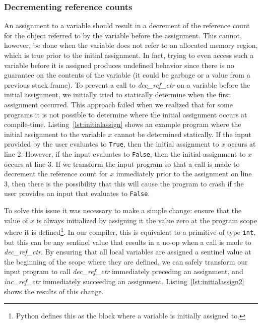 \documentclass{sigplanconf}
\newcommand{\avariable}[1]{\ensuremath{#1}}
\newcommand{\aliteral}[1]{\texttt{#1}}
\newcommand{\afunction}[1]{\textit{#1}}
\newcommand{\atype}[1]{\texttt{#1}}
\begin{document}
\subsubsection{Decrementing reference counts}
An assignment to a variable should result in a decrement of the reference count for the object referred to by the variable before the assignment.  This cannot, however, be done when the variable does not refer to an allocated memory region, which is true prior to the initial assignment.  In fact, trying to even access such a variable before it is assigned produces undefined behavior since there is no guarantee on the contents of the variable (it could be garbage or a value from a previous stack frame).   To prevent a call to \afunction{dec\_ref\_ctr} on a variable before the initial assignment, we initially tried to statically determine when the first assignment occurred.  This approach failed when we realized that for some programs it is not possible to determine where the initial assignment occurs at compile-time.  Listing~\ref{lst:initialassign} shows an example program where the initial assignment to the variable \avariable{x} cannot be determined statically.  If the input provided by the user evaluates to \aliteral{True}, then the initial assignment to $x$ occurs at line 2.  However, if the input evaluates to \aliteral{False}, then the initial assignment to \avariable{x} occurs at line 3.  If we transform the input program so that a call is made to decrement the reference count for \avariable{x} immediately prior to the assignment on line 3, then there is the possibility that this will cause the program to crash if the user provides an input that evaluates to \aliteral{False}.

To solve this issue it was necessary to make a simple change: ensure that the value of \avariable{x} is always initialized by assigning it the value zero at the program scope where it is defined\footnote{Python defines this as the block where a variable is initially assigned to.}.  In our compiler, this is equivalent to a primitive of type \atype{int}, but this can be any sentinel value that results in a no-op when a call is made to \afunction{dec\_ref\_ctr}.  By ensuring that all local variables are assigned a sentinel value at the beginning of the scope where they are defined, we can safely transform our input program to call \afunction{dec\_ref\_ctr} immediately preceding an assignment, and \afunction{inc\_ref\_ctr} immediately succeeding an assignment.  Listing~\ref{lst:initialassign2} shows the results of this change.
\end{document}
